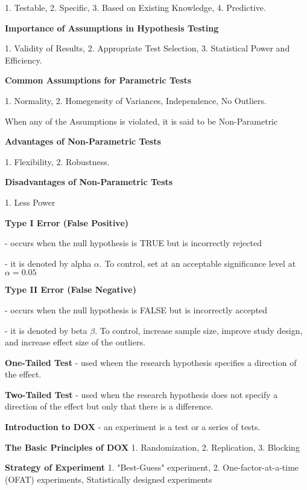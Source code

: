 \documentclass[4pt]{article}
\begin{document}
\begin{multicols*}{2}
    1. Testable, 2. Specific, 3. Based on Existing Knowledge, 4. Predictive.

    \textbf{Importance of Assumptions in Hypothesis Testing}

    1. Validity of Results, 2. Appropriate Test Selection, 3. Statistical Power and Efficiency.

    \textbf{Common Assumptions for Parametric Tests}

    1. Normality, 2. Homegeneity of Variances, Independence, No Outliers.

    When any of the Assumptions is violated, it is said to be Non-Parametric
   
    \textbf{Advantages of Non-Parametric Tests}

    1. Flexibility, 2. Robustness.

    \textbf{Disadvantages of Non-Parametric Tests}

    1. Less Power

    \textbf{Type I Error (False Positive)}
    
    - occurs when the null hypothesis is TRUE but is incorrectly rejected

    - it is denoted by alpha $\alpha$. To control, set at an acceptable significance level at $\alpha = 0.05$
    
    \textbf{Type II Error (False Negative)}

    - occurs when the null hypothesis is FALSE but is incorrectly accepted

    - it is denoted by beta $\beta$. To control, increase sample size, improve study design, and increase effect size of the outliers.
    
    \textbf{One-Tailed Test} - used wheen the research hypothesis specifies a direction of the effect.

    \textbf{Two-Tailed Test} - used when the research hypothesis does not specify a direction of the effect but only that there is a difference.
    
    \textbf{Introduction to DOX} - an experiment is a test or a series of tests.

    \textbf{The Basic Principles of DOX}
    1. Randomization, 2. Replication, 3. Blocking

    \textbf{Strategy of Experiment}
    1. "Best-Guess" experiment, 2. One-factor-at-a-time (OFAT) experiments, Statistically designed experiments
    \end{multicols*}
\end{document}
